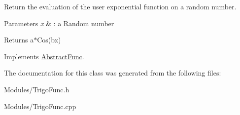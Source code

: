 Return the evaluation of the user exponential function on a random number. 


\begin{DoxyParams}{Parameters}
{\em x} & \+: a Random number \\
\hline
\end{DoxyParams}
\begin{DoxyReturn}{Returns}
a$\ast$\+Cos(bx) 
\end{DoxyReturn}


Implements \hyperlink{classAbstractFunc_ac98be1daa5131b9fddcfdba0a2c34871}{Abstract\+Func}.



The documentation for this class was generated from the following files\+:\begin{DoxyCompactItemize}
\item 
Modules/Trigo\+Func.\+h\item 
Modules/Trigo\+Func.\+cpp\end{DoxyCompactItemize}
